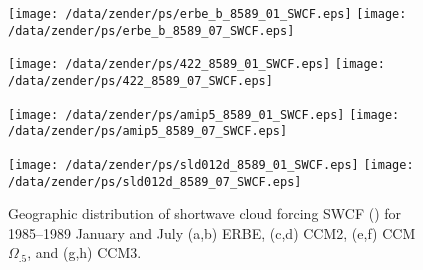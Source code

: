 \documentclass[twocolumn,final,11pt]{article}
\begin{document}
\setlength\abovecaptionskip{9pt}
\setlength\belowcaptionskip{9pt}

\setlength\floatsep{0pt}
\setlength\textfloatsep{0pt}
\setlength\dblfloatsep{0pt}
\setlength\dbltextfloatsep{0pt}
\setlength\intextsep{0pt}

\setcounter{page}{1}
\pagestyle{myheadings}
\thispagestyle{empty}
\onecolumn
\listoffigures
\twocolumn
{}
\setcounter{page}{1}


% 
%

\begin{figure*}
\begin{center}
\texttt{[image: /data/zender/ps/erbe\_b\_8589\_01\_SWCF.eps]}%
\texttt{[image: /data/zender/ps/erbe\_b\_8589\_07\_SWCF.eps]}%

\texttt{[image: /data/zender/ps/422\_8589\_01\_SWCF.eps]}%
\texttt{[image: /data/zender/ps/422\_8589\_07\_SWCF.eps]}%

\texttt{[image: /data/zender/ps/amip5\_8589\_01\_SWCF.eps]}%
\texttt{[image: /data/zender/ps/amip5\_8589\_07\_SWCF.eps]}%

\texttt{[image: /data/zender/ps/sld012d\_8589\_01\_SWCF.eps]}%
\texttt{[image: /data/zender/ps/sld012d\_8589\_07\_SWCF.eps]}%
\end{center}
\caption[Geographic distribution of shortwave cloud forcing SWCF
for 1985--1989 January and July ERBE, CCM2, CCM$\Omega_{.5}$, and CCM3]{
Geographic distribution of shortwave cloud forcing SWCF (\wxmS) for
1985--1989 January and July (a,b) ERBE, (c,d) CCM2, (e,f)
CCM$\Omega_{.5}$, and (g,h) CCM3.   
\label{fig:8589_SWCF}}   
\end{figure*}
\clearpage
\end{document}
